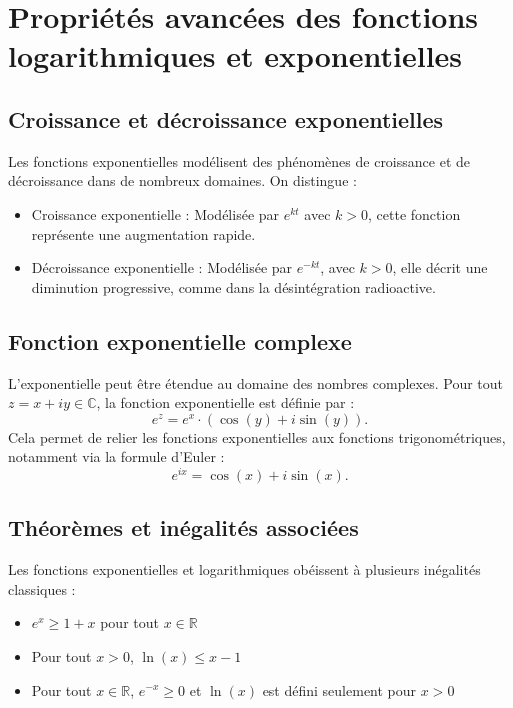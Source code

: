 \documentclass{article}
\begin{document}
	\section{Propriétés avancées des fonctions logarithmiques et exponentielles}
	
	\subsection{Croissance et décroissance exponentielles}
	
	Les fonctions exponentielles modélisent des phénomènes de croissance et de décroissance dans de nombreux domaines. On distingue :
	\begin{itemize}
		\item Croissance exponentielle : Modélisée par \( e^{kt} \) avec \( k > 0 \), cette fonction représente une augmentation rapide.
		\item Décroissance exponentielle : Modélisée par \( e^{-kt} \), avec \( k > 0 \), elle décrit une diminution progressive, comme dans la désintégration radioactive.
	\end{itemize}
	
	\subsection{Fonction exponentielle complexe}
	
	L'exponentielle peut être étendue au domaine des nombres complexes. Pour tout \( z = x + iy \in \mathbb{C} \), la fonction exponentielle est définie par :
	\[
	e^z = e^x \cdot \left( \cos(y) + i\sin(y) \right).
	\]
	Cela permet de relier les fonctions exponentielles aux fonctions trigonométriques, notamment via la formule d'Euler :
	\[
	e^{ix} = \cos(x) + i\sin(x).
	\]
	
	\subsection{Théorèmes et inégalités associées}
	
	Les fonctions exponentielles et logarithmiques obéissent à plusieurs inégalités classiques :
	\begin{itemize}
		\item \( e^x \geq 1 + x \) pour tout \( x \in \mathbb{R} \)
		\item Pour tout \( x > 0 \), \( \ln(x) \leq x - 1 \)
		\item Pour tout \( x \in \mathbb{R} \), \( e^{-x} \geq 0 \) et \( \ln(x) \) est défini seulement pour \( x > 0 \)
	\end{itemize}
\end{document}
